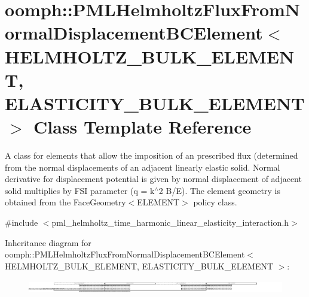 \hypertarget{classoomph_1_1PMLHelmholtzFluxFromNormalDisplacementBCElement}{}\section{oomph\+:\+:P\+M\+L\+Helmholtz\+Flux\+From\+Normal\+Displacement\+B\+C\+Element$<$ H\+E\+L\+M\+H\+O\+L\+T\+Z\+\_\+\+B\+U\+L\+K\+\_\+\+E\+L\+E\+M\+E\+NT, E\+L\+A\+S\+T\+I\+C\+I\+T\+Y\+\_\+\+B\+U\+L\+K\+\_\+\+E\+L\+E\+M\+E\+NT $>$ Class Template Reference}
\label{classoomph_1_1PMLHelmholtzFluxFromNormalDisplacementBCElement}


A class for elements that allow the imposition of an prescribed flux (determined from the normal displacements of an adjacent linearly elastic solid. Normal derivative for displacement potential is given by normal displacement of adjacent solid multiplies by F\+SI parameter (q = k$^\wedge$2 B/E). The element geometry is obtained from the Face\+Geometry$<$\+E\+L\+E\+M\+E\+N\+T$>$ policy class.  




{\ttfamily \#include $<$pml\+\_\+helmholtz\+\_\+time\+\_\+harmonic\+\_\+linear\+\_\+elasticity\+\_\+interaction.\+h$>$}

Inheritance diagram for oomph\+:\+:P\+M\+L\+Helmholtz\+Flux\+From\+Normal\+Displacement\+B\+C\+Element$<$ H\+E\+L\+M\+H\+O\+L\+T\+Z\+\_\+\+B\+U\+L\+K\+\_\+\+E\+L\+E\+M\+E\+NT, E\+L\+A\+S\+T\+I\+C\+I\+T\+Y\+\_\+\+B\+U\+L\+K\+\_\+\+E\+L\+E\+M\+E\+NT $>$\+:\begin{figure}[H]
\begin{center}
\leavevmode
\includegraphics[height=0.591029cm]{classoomph_1_1PMLHelmholtzFluxFromNormalDisplacementBCElement}
\end{center}
\end{figure}
